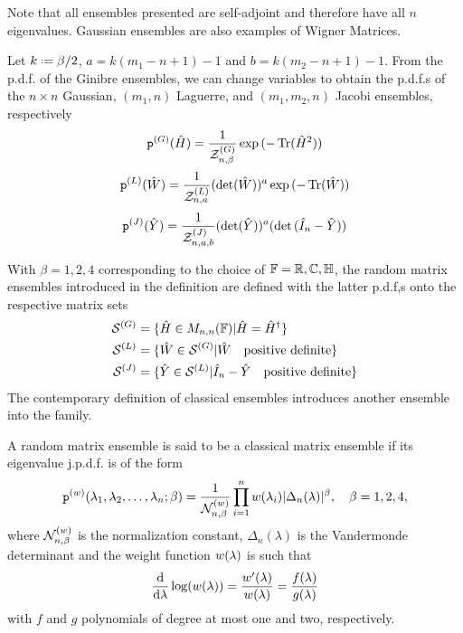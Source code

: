 Note that all ensembles presented are self-adjoint and therefore have all $n$ eigenvalues. Gaussian ensembles are also examples of Wigner Matrices.

\begin{prop}
	Let $k \deff \beta /2$, $a=k(m_1-n+1)-1$ and $b=k(m_2-n+1)-1$. From the p.d.f. of the Ginibre ensembles, we can change variables to obtain the p.d.f.s of the $n \times n$ Gaussian, $(m_1, n)$  Laguerre, and $(m_1,m_2,n)$ Jacobi ensembles, respectively
	\begin{equation}
		\mathtt{p}^{(G)}(\hat H) = \frac{1}{\mathcal{Z}_{n,\beta}^{(G)}} \exp{(-\operatorname{Tr}(\hat H^2))}
	\end{equation}
	\begin{equation}
		\mathtt{p}^{(L)}(\hat W) = \frac{1}{\mathcal{Z}_{n,a}^{(L)}} (\det(\hat W))^a \exp{(-\operatorname{Tr}(\hat W))}
	\end{equation}
	\begin{equation}
		\mathtt{p}^{(J)}(\hat Y) = \frac{1}{\mathcal{Z}_{n,a,b}^{(J)}} (\det(\hat Y))^a (\det{(\hat I_n - \hat Y)})
	\end{equation}
	\label{Prop: Gaussian, Laguerre, Jacobi}
\end{prop}
With $\beta = 1, 2, 4$ corresponding to the choice of $\mathbb{F} = \mathbb{R}, \mathbb{C}, \mathbb{H}$, the random matrix ensembles introduced in the definition are defined with the latter p.d.f,s onto the respective matrix sets
\begin{equation}
	\begin{aligned}
		\mathcal{S}^{(G)} & = \{ \hat H \in M_{n,n}(\mathbb{F}) | \hat H = \hat H^\dagger \} \\
		\mathcal{S}^{(L)} & = \{ \hat W \in \mathcal{S}^{(G)} | \hat W \quad \text{positive definite} \} \\
		\mathcal{S}^{(J)} & = \{ \hat Y \in \mathcal{S}^{(L)} | \hat I_n - \hat Y \quad \text{positive definite} \} \\
	\end{aligned}
\end{equation}
The contemporary definition of classical ensembles introduces another ensemble into the family.

\begin{definition}
	A random matrix ensemble is said to be a classical matrix ensemble if its eigenvalue j.p.d.f. is of the form
	\begin{equation}
		\mathtt{p}^{(w)}(\lambda_1, \lambda_2, \dots, \lambda_n;\beta) = \frac{1}{\mathcal{N}_{n,\beta}^{(w)}} \prod_{i=1}^{n} w(\lambda_i) |\Delta_n(\lambda)|^\beta, \quad \beta = 1,2,4,
	\end{equation}
	where $\mathcal{N}_{n,\beta}^{(w)}$ is the normalization constant, $\Delta_n(\lambda)$ is the Vandermonde determinant and the weight function $w(\lambda)$ is such that
	\begin{equation}
		\frac{\mathrm{d}}{\mathrm{d} \lambda} \log(w(\lambda)) = \frac{w'(\lambda)}{w(\lambda)} = \frac{f(\lambda)}{g(\lambda)}
	\end{equation}
	with $f$ and $g$ polynomials of degree at most one and two, respectively.
	\label{Def: Classical Ensembles}
\end{definition}

